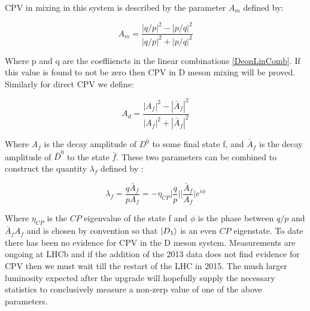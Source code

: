 CPV in mixing in this system is described by the parameter $A_{m}$ defined by:

\begin{equation*}
A_{m} = \frac{|q/p|^{2} - |p/q|^{2}}{|q/p|^{2} + |p/q|^{2}}
\end{equation*}

\noindent Where p and q are the coeffiiencts in the linear combinations \ref{DeonLinComb}. If this value is found to not be zero then CPV in D meson mixing will be proved. Similarly for direct CPV we define:

\begin{equation*}
A_{d} = \frac{|A_{f}|^{2} - |\bar{A}_{f}|^{2}}{|A_{f}|^{2} + |\bar{A}_{f}|^{2}}
\end{equation*}

\noindent Where $A_{f}$ is the decay amplitude of $D^{0}$ to some final state f, and $\bar{A}_{f}$ is the decay amplitude of $\bar{D}^{0}$ to the state $\bar{f}$. These two parameters can be combined to construct the quantity $\lambda_{f}$ defined by \cite{LHCbAsymmetry}:

\begin{equation*}
\lambda_{f} = \frac{q \bar{A}_{f}}{p A_{f}} = - \eta_{CP} \bigg|\frac{q}{p}\bigg| \bigg|\frac{\bar{A}_{f}}{A_{f}}\bigg| e^{i \phi}
\end{equation*}

\noindent Where $\eta_{CP}$ is the $CP$ eigenvalue of the state f and $\phi$ is the phase between $q/p$ and ${\bar{A}_{f}}{A_{f}}$ and is chosen by convention so that $\ket{D_{1}}$ is an even $CP$ eigenstate. To date there has been no evidence for CPV in the D meson system. Measurements are ongoing at LHCb and if the addition of the 2013 data does not find evidence for CPV then we must wait till the restart of the LHC in 2015. The mush larger luminosity expected after the upgrade will hopefully supply the necessary statistics to conclusively measure a non-zerp value of one of the above parameters. 





